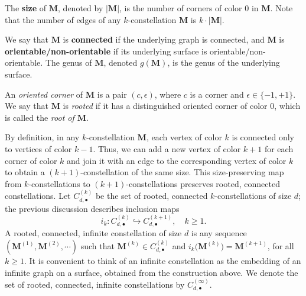 \documentclass[11pt]{article}
\theoremstyle{plain}
\newcommand{\MM}{\mathbf M}
\begin{document}
The \textbf{size} of $\MM$, denoted by $|\MM|$, is the number of corners of color $0$ in $\MM$.
Note that the number of edges of any $k$-constellation $\MM$ is $k\cdot|\MM|$.

We say that $\MM$ is \textbf{connected} if the underlying graph is connected, and $\MM$ is \textbf{orientable/non-orientable} if its underlying surface is orientable/non-orientable. The genus of $\MM$, denoted $g(\MM)$, is the genus of the underlying surface.

An \emph{oriented corner} of $\MM$ is a pair $(c,\epsilon)$, where $c$ is a corner and $\epsilon\in\{-1,+1\}$.
We say that $\MM$ is \emph{rooted} if it has a distinguished oriented corner of color $0$, which is called the \emph{root of $\MM$}.

By definition, in any $k$-constellation $\MM$, each vertex of color $k$ is connected only to vertices of color $k-1$.
Thus, we can add a new vertex of color $k+1$ for each corner of color $k$ and join it with an edge to the corresponding vertex of color $k$ to obtain a $(k+1)$-constellation of the same size.
This size-preserving map from $k$-constellations to $(k+1)$-constellations preserves rooted, connected constellations. Let $C_{d,\bullet}^{(k)} $ be the set of rooted, connected $k$-constellations of size $d$; the previous discussion describes inclusion maps
\[
i_k\colon C_{d,\bullet}^{(k)} \hookrightarrow C_{d,\bullet}^{(k+1)},\quad k\ge 1.
\]
A rooted, connected, infinite constellation of size $d$ is any sequence $(\MM^{(1)}, \MM^{(2)}, \cdots)$ such that $\MM^{(k)}\in C_{d,\bullet}^{(k)}$ and $i_k\big( \MM^{(k)} \big) = \MM^{(k+1)}$, for all $k\ge 1$.
It is convenient to think of an infinite constellation as the embedding of an infinite graph on a surface, obtained from the construction above. We denote the set of rooted, connected, infinite constellations by $C_{d,\bullet}^{(\infty)}$.
\end{document}
